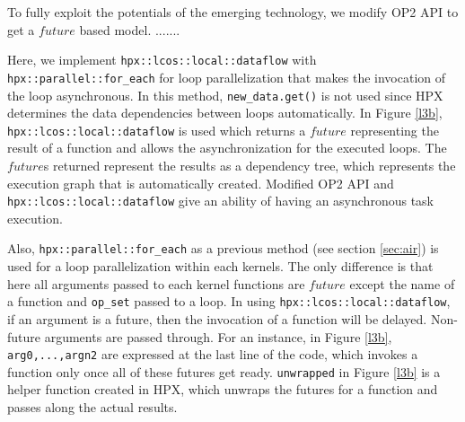 \documentclass[conference]{IEEEtran}
\begin{document}
To fully exploit the potentials of the emerging technology, we modify OP2 API to get a $future$ based model. .......

Here, we implement \texttt{hpx::lcos::local::dataflow} with \texttt{hpx::parallel::for\_each} for loop parallelization that makes the invocation of the loop asynchronous. In this method, \texttt{new\_data.get()}  is not used since HPX determines the data dependencies between loops automatically. In Figure \ref{l3b}, \texttt{hpx::lcos::local::dataflow} is used which returns a $future$ representing the result of a function and allows the asynchronization for the executed loops. The $future$s returned represent the results as a dependency tree, which represents the execution graph that is automatically created. Modified OP2 API and \texttt{hpx::lcos::local::dataflow} give an ability of having an asynchronous task execution. 

Also, \texttt{hpx::parallel::for\_each} as a previous method (see section \ref{sec:air}) is used for a loop parallelization within each kernels. The only difference is that here all arguments passed to each kernel functions are $future$ except the name of a function and \texttt{op\_set} passed to a loop. In using \texttt{hpx::lcos::local::dataflow}, if an argument is a future, then the invocation of a function will be delayed. Non-future arguments are passed through. For an instance, in Figure \ref{l3b}, \texttt{arg0,...,argn2} are expressed at the last line of the code, which invokes a function only once all of these futures get ready. \texttt{unwrapped} in Figure \ref{l3b} is a helper function created in HPX, which  unwraps the futures for a function and  passes along the actual results. 
\end{document}
